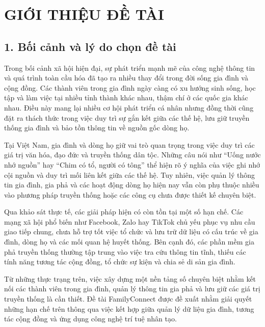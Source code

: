 
\chapter*{GIỚI THIỆU ĐỀ TÀI}

{}

\label{chap:gioi_thieu_de_tai}


\section*{1. Bối cảnh và lý do chọn đề tài}
{}

Trong bối cảnh xã hội hiện đại, sự phát triển mạnh mẽ của công nghệ thông tin và quá trình toàn cầu hóa đã tạo ra nhiều thay đổi trong đời sống gia đình và cộng đồng. Các thành viên trong gia đình ngày càng có xu hướng sinh sống, học tập và làm việc tại nhiều tỉnh thành khác nhau, thậm chí ở các quốc gia khác nhau. Điều này mang lại nhiều cơ hội phát triển cá nhân nhưng đồng thời cũng đặt ra thách thức trong việc duy trì sự gắn kết giữa các thế hệ, lưu giữ truyền thống gia đình và bảo tồn thông tin về nguồn gốc dòng họ.

Tại Việt Nam, gia đình và dòng họ giữ vai trò quan trọng trong việc duy trì các giá trị văn hóa, đạo đức và truyền thống dân tộc. Những câu nói như ``Uống nước nhớ nguồn'' hay ``Chim có tổ, người có tông'' thể hiện rõ ý nghĩa của việc ghi nhớ cội nguồn và duy trì mối liên kết giữa các thế hệ. Tuy nhiên, việc quản lý thông tin gia đình, gia phả và các hoạt động dòng họ hiện nay vẫn còn phụ thuộc nhiều vào phương pháp truyền thống hoặc các công cụ chưa được thiết kế chuyên biệt.

Qua khảo sát thực tế, các giải pháp hiện có còn tồn tại một số hạn chế. Các mạng xã hội phổ biến như Facebook, Zalo hay TikTok chủ yếu phục vụ nhu cầu giao tiếp chung, chưa hỗ trợ tốt việc tổ chức và lưu trữ dữ liệu có cấu trúc về gia đình, dòng họ và các mối quan hệ huyết thống. Bên cạnh đó, các phần mềm gia phả truyền thống thường tập trung vào việc tra cứu thông tin tĩnh, thiếu các tính năng tương tác cộng đồng, tổ chức sự kiện và chia sẻ di sản gia đình.

Từ những thực trạng trên, việc xây dựng một nền tảng số chuyên biệt nhằm kết nối các thành viên trong gia đình, quản lý thông tin gia phả và lưu giữ các giá trị truyền thống là cần thiết. Đề tài FamilyConnect được đề xuất nhằm giải quyết những hạn chế trên thông qua việc kết hợp giữa quản lý dữ liệu gia đình, tương tác cộng đồng và ứng dụng công nghệ trí tuệ nhân tạo.

